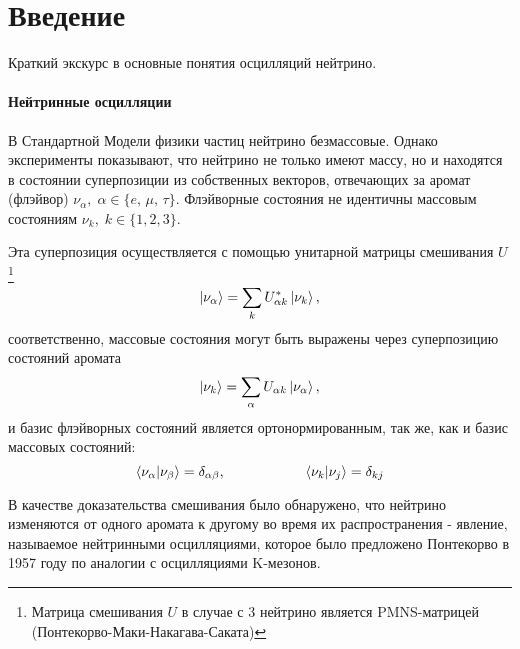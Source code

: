 \documentclass[12pt]{article}
\renewcommand{\thepage}{\large\arabic{page}}
\numberwithin{equation}{section}
\begin{document}
\pagestyle{fancy} %
\fancyhf{} %

\renewcommand{\headrulewidth}{0pt}
\fancyfoot[FR]{\thepage} %
\setcounter{page}{4} %

\section*{\large Введение}
\indent
Краткий экскурс в основные понятия осцилляций нейтрино.
\paragraph{\large Нейтринные осцилляции}

В Стандартной Модели физики частиц нейтрино безмассовые. Однако эксперименты показывают, что нейтрино не только имеют массу, но и находятся в состоянии суперпозиции из собственных векторов, отвечающих за аромат (флэйвор) $\nu_{\alpha}, \; \alpha \!\in \!\{e,\,\mu,\, \tau\}$. Флэйворные состояния не идентичны массовым состояниям $\nu_{k}, \; k\!\in\! \{1,2,3\}$.
	
Эта суперпозиция осуществляется с помощью унитарной матрицы смешивания $U$ \footnote {Матрица смешивания $U$ в случае с 3 нейтрино является PMNS-матрицей (Понтекорво-Маки-Накагава-Саката)}
\begin{equation}
\label{mixing}
\ket{\nu_{\alpha}} = \sum_{k} U^*_{\alpha k} \ket{\nu_{k}}, 
\end{equation}
соответственно, массовые состояния могут быть выражены через суперпозицию состояний аромата
\begin{equation}
\ket{\nu_{k}} = \sum_{\alpha} U_{\alpha k} \ket{\nu_{\alpha}},
\end{equation}
и базис флэйворных состояний является ортонормированным, так же, как и базис массовых состояний:
\begin{equation}
\braket{\nu_{\alpha}|\nu_{\beta}} = \delta_{\alpha\beta},
\hspace{2cm} 
\braket{\nu_{k}|\nu_{j}}=\delta_{kj}
\end{equation}
	
В качестве доказательства смешивания было обнаружено, что нейтрино изменяются от одного аромата к другому во время их распространения - явление, называемое нейтринными осцилляциями, которое было предложено Понтекорво в 1957 году по аналогии с осцилляциями K-мезонов.
\end{document}
